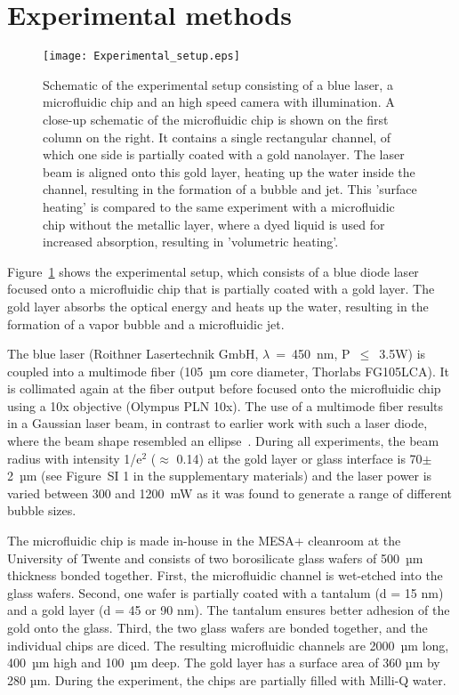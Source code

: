 \documentclass[11pt]{article}
\begin{document}
\section{Experimental methods}\label{C4: sec: methods}
\begin{figure}[b!]
	\texttt{[image: Experimental\_setup.eps]}
	\centering
	\captionsetup{width=\linewidth}
	\caption{Schematic of the experimental setup consisting of a blue laser, a microfluidic chip and an high speed camera with illumination. A close-up schematic of the microfluidic chip is shown on the first column on the right. It contains a single rectangular channel, of which one side is partially coated with a gold nanolayer. The laser beam is aligned onto this gold layer, heating up the water inside the channel, resulting in the formation of a bubble and jet. This 'surface heating' is compared to the same experiment with a microfluidic chip without the metallic layer, where a dyed liquid is used for increased absorption, resulting in 'volumetric heating'.}
	\label{C4: fig: ExperimentalSetup}
\end{figure} 

Figure~\ref{C4: fig: ExperimentalSetup} shows the experimental setup, which consists of a blue diode laser focused onto a microfluidic chip that is partially coated with a gold layer. The gold layer absorbs the optical energy and heats up the water, resulting in the formation of a vapor bubble and a microfluidic jet.

The blue laser (Roithner Lasertechnik GmbH, $\lambda $~=~450~nm, P~$\leq$~3.5W) is coupled into a multimode fiber (105~µm core diameter, Thorlabs FG105LCA). It is collimated again at the fiber output before focused onto the microfluidic chip using a 10x objective (Olympus PLN 10x). The use of a multimode fiber results in a Gaussian laser beam, in contrast to earlier work with such a laser diode, where the beam shape resembled an ellipse~\cite{OyarteGalvez2019,OyarteGalvez2020}. During all experiments, the beam radius with intensity 1/e$^2$ ($\approx$ 0.14) at the gold layer or glass interface is 70$\pm$2~µm (see Figure~SI 1 in the supplementary materials) and the laser power is varied between 300 and 1200~mW as it was found to generate a range of different bubble sizes.

The microfluidic chip is made in-house in the MESA+ cleanroom at the University of Twente and consists of two borosilicate glass wafers of 500~µm thickness bonded together. First, the microfluidic channel is wet-etched into the glass wafers. Second, one wafer is partially coated with a tantalum (d = 15 nm) and a gold layer (d = 45 or 90 nm). The tantalum ensures better adhesion of the gold onto the glass. Third, the two glass wafers are bonded together, and the individual chips are diced. The resulting microfluidic channels are 2000~µm long, 400~µm high and 100~µm deep. The gold layer has a surface area of 360 µm by 280 µm. During the experiment, the chips are partially filled with Milli-Q water.
\end{document}
